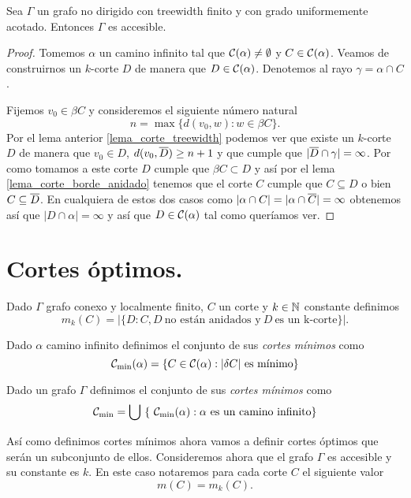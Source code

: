 \documentclass[tesis.tex]{subfiles}
\begin{document}
\begin{teo}\label{teo_treewidth_fin_accesible}
	Sea $\Gamma$ un grafo no dirigido con treewidth finito y con grado uniformemente acotado.
	Entonces $\Gamma$ es accesible.
\end{teo}
\begin{proof}
	Tomemos $\alpha$ un camino infinito tal que ${\cal C}(\alpha) \neq \emptyset$ y $C \in {\cal C}(\alpha)$.
	Veamos de construirnos un $k$-corte $D$ de manera que $D \in {\cal C}(\alpha)$.
	Denotemos al rayo $\gamma = \alpha \cap C$.
	
	Fijemos $v_0  \in \beta C$ y consideremos el siguiente número natural
	\[
	n = \max \{ d(v_0,w) : w \in \beta C  \}.
	\]
	Por el lema anterior \ref{lema_corte_treewidth} podemos ver que existe un $k$-corte $D$ de manera que $v_{0} \in D$, $d(v_0, \overline D) \ge n+1$ y que cumple que $|\overline D \cap \gamma| = \infty$.
	Por como tomamos a este corte $D$ cumple que $\beta C \subset D$ y así por el lema \ref{lema_corte_borde_anidado} tenemos que el corte $C$ cumple que 
	$C \subseteq D$ o bien $C \subseteq \overline D$.
	En cualquiera de estos dos casos como $|\alpha \cap C| = |\alpha \cap \overline  C| = \infty$ obtenemos así que $|D \cap \alpha|=\infty$ y así que $D \in {\cal C}(\alpha)$ tal como queríamos ver. 
	
\end{proof}


\section{Cortes óptimos.}\label{secc_copt}

\begin{deff}
	Dado $\Gamma$ grafo conexo y localmente finito, $C$ un corte y $k \in \mathbb{N}$ constante definimos
	\[
	m_k(C) = | \{  D : C, D \ \text{no están anidados y} \ D \ \text{es un k-corte}   \} |. 
	\]
\end{deff}

\begin{deff}
	Dado $\alpha$ camino infinito definimos el conjunto de sus \emph{cortes mínimos} como
	\[
	\cam = \{  C \in \ca : |\delta C| \ \text{es mínimo}  \}
	\]
	
	Dado un grafo $\Gamma$ definimos el conjunto de sus \emph{cortes mínimos} como 
	\[
	{\cal C}_{\text{min}} = \bigcup \ \{ \ {\cal C}_{\text{min}}(\alpha) : \alpha \ \text{es un camino infinito}  \}
	\]
\end{deff}


Así como definimos cortes mínimos ahora vamos a definir cortes óptimos que serán un subconjunto de ellos.
Consideremos ahora que el grafo $\Gamma$ es accesible y su constante es $k$.
En este caso notaremos para cada corte $C$ el siguiente valor
\[
m(C) = m_k(C).
\]
\end{document}
